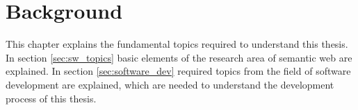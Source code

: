 \chapter{Background}
\label{ch:background}

This chapter explains the fundamental topics required to understand this thesis.
\\

In section \ref{sec:sw_topics} basic elements of the research area of semantic web are explained.
In section \ref{sec:software_dev} required topics from the field of software development are explained, which are needed to understand the development process of this thesis.




